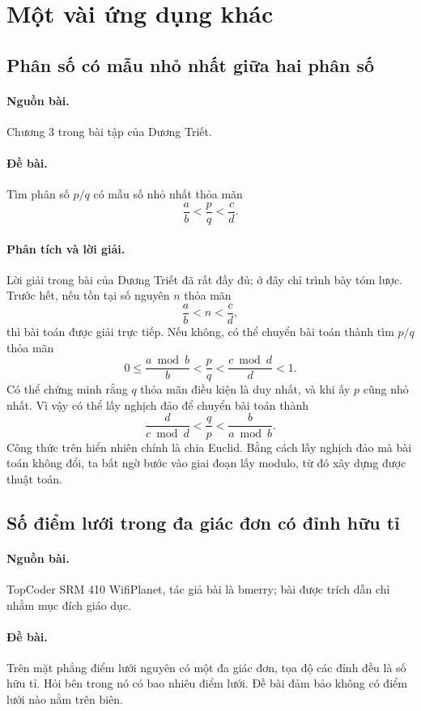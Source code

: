 \documentclass[11pt]{article}
\begin{document}
\section{Một vài ứng dụng khác}

\subsection{Phân số có mẫu nhỏ nhất giữa hai phân số}

\paragraph{Nguồn bài.} Chương 3 trong bài tập của Dương Triết.

\paragraph{Đề bài.} Tìm phân số $p/q$ có mẫu số nhỏ nhất thỏa mãn
\[
  \frac{a}{b}<\frac{p}{q}<\frac{c}{d}.
\]

\paragraph{Phân tích và lời giải.}
Lời giải trong bài của Dương Triết đã rất đầy đủ; ở đây chỉ trình bày tóm
lược. Trước hết, nếu tồn tại số nguyên $n$ thỏa mãn
\[
  \frac{a}{b}<n<\frac{c}{d},
\]
thì bài toán được giải trực tiếp. Nếu không, có thể chuyển bài toán thành tìm
$p/q$ thỏa mãn
\[
  0\le \frac{a\bmod b}{b}<\frac{p}{q}<\frac{c\bmod d}{d}<1.
\]
Có thể chứng minh rằng $q$ thỏa mãn điều kiện là duy nhất, và khi ấy $p$ cũng
nhỏ nhất. Vì vậy có thể lấy nghịch đảo để chuyển bài toán thành
\[
  \frac{d}{c\bmod d}<\frac{q}{p}<\frac{b}{a\bmod b}.
\]
Công thức trên hiển nhiên chính là chia Euclid. Bằng cách lấy nghịch đảo mà
bài toán không đổi, ta bất ngờ bước vào giai đoạn lấy modulo, từ đó xây dựng
được thuật toán.

\subsection{Số điểm lưới trong đa giác đơn có đỉnh hữu tỉ}

\paragraph{Nguồn bài.} TopCoder SRM 410 WifiPlanet, tác giả bài là bmerry;
bài được trích dẫn chỉ nhằm mục đích giáo dục.

\paragraph{Đề bài.} Trên mặt phẳng điểm lưới nguyên có một đa giác đơn, tọa độ
các đỉnh đều là số hữu tỉ. Hỏi bên trong nó có bao nhiêu điểm lưới. Đề bài đảm
bảo không có điểm lưới nào nằm trên biên.
\end{document}
